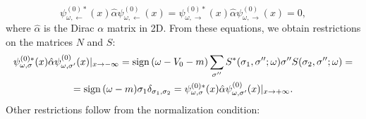 \documentclass[12pt]{article}
\numberwithin{equation}{section}
\begin{document}
$$
\mathit{\psi}^{(0)*}_{\omega,\leftarrow}(x) \hat{\alpha} \mathit{\psi}^{(0)}_{\omega,\leftarrow}(x) = \mathit{\psi}^{(0)*}_{\omega,\rightarrow}(x) \hat{\alpha} \mathit{\psi}^{(0)}_{\omega,\rightarrow}(x) = 0,$$ 
where $\hat{\alpha}$ is the Dirac $\alpha$ matrix in 2D.
From these equations, we obtain restrictions on the matrices $N$ and $S$:
\begin{gather}
\psi^{(0)*}_{\omega,\sigma}(x)\hat{\alpha}\psi^{(0)}_{\omega,\sigma'}(x)|_{x\rightarrow-\infty} = {\rm sign} \, (\omega-V_0-m)\sum_{\sigma''}S^*(\sigma_1,\sigma'';\omega)\sigma''S(\sigma_2,\sigma'';\omega)=\nonumber\\ = {\rm sign} \, (\omega-m)\sigma_1\delta_{\sigma_1,\sigma_2}= \psi^{(0)*}_{\omega,\sigma}(x)\hat{\alpha}\psi^{(0)}_{\omega,\sigma'}(x)|_{x\rightarrow+\infty}.
\end{gather}
Other restrictions follow from the normalization condition:
\end{document}

